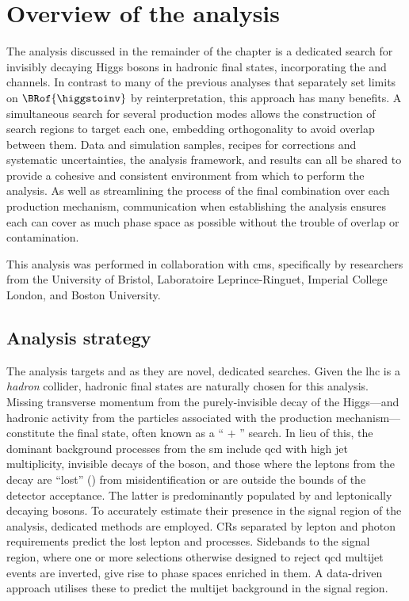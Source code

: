 \section{Overview of the analysis}
\label{sec:htoinv_analysis_overview}

The analysis discussed in the remainder of the chapter is a dedicated search for invisibly decaying Higgs bosons in hadronic final states, incorporating the \ttH and \VH channels. In contrast to many of the previous analyses that separately set limits on $\BRof{\higgstoinv}$ by reinterpretation, this approach has many benefits. A simultaneous search for several production modes allows the construction of search regions to target each one, embedding orthogonality to avoid overlap between them. Data and simulation samples, recipes for corrections and systematic uncertainties, the analysis framework, and results can all be shared to provide a cohesive and consistent environment from which to perform the analysis. As well as streamlining the process of the final combination over each production mechanism, communication when establishing the analysis ensures each can cover as much phase space as possible without the trouble of overlap or contamination.

This analysis was performed in collaboration with \acrshort{cms}, specifically by researchers from the University of Bristol, Laboratoire Leprince-Ringuet, Imperial College London, and Boston University.




\subsection{Analysis strategy}
\label{subsec:htoinv_analysis_strategy}

The analysis targets \ttH and \VH as they are novel, dedicated searches. Given the \acrshort{lhc} is a \emph{hadron} collider, hadronic final states are naturally chosen for this analysis. Missing transverse momentum from the purely-invisible decay of the Higgs---and hadronic activity from the particles associated with the production mechanism---constitute the final state, often known as a `` $+$ \ptvecmiss'' search. In lieu of this, the dominant background processes from the \acrlong{sm} include \acrshort{qcd} with high \gls{jet} multiplicity, invisible decays of the \PZ boson, and those where the leptons from the decay are ``lost'' (\lostlepton) from misidentification or are outside the bounds of the detector acceptance. The latter is predominantly populated by \ttbar and leptonically decaying \PW bosons. To accurately estimate their presence in the signal region of the analysis, dedicated methods are employed. \Glspl{CR} separated by lepton and photon requirements predict the lost lepton and \ztonunu processes. Sidebands to the signal region, where one or more selections otherwise designed to reject \acrshort{qcd} multijet events are inverted, give rise to phase spaces enriched in them. A data-driven approach utilises these to predict the multijet background in the signal region.

